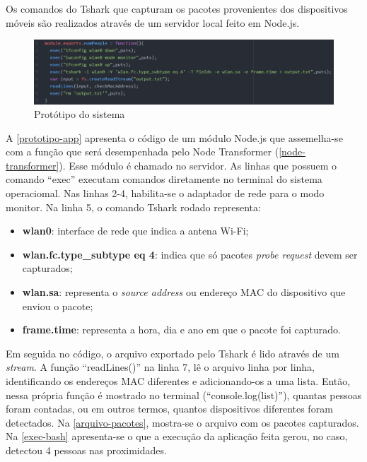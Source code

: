 Os comandos do Tshark que capturam os pacotes provenientes dos dispositivos móveis são realizados através de um servidor local
feito em Node.js.

\begin{figure}[!h]
  \caption{\label{prototipo-app}Protótipo do sistema}
  \begin{center}
    \includegraphics[width=1.0\textwidth]{img/prototipo-app.png}
  \end{center}
\end{figure}

A \autoref{prototipo-app} apresenta o código de um módulo Node.js que
assemelha-se com a função que será desempenhada pelo Node Transformer
(\autoref{node-transformer}). Esse módulo é chamado no servidor. As linhas que
possuem o comando ``exec'' executam comandos diretamente no terminal do sistema
operaciomal. Nas linhas 2-4, habilita-se o adaptador de rede para o modo
monitor. Na linha 5, o comando Tshark rodado representa:

\begin{itemize}
  \item \textbf{wlan0}: interface de rede que indica a antena Wi-Fi;
  \item \textbf{wlan.fc.type\_subtype eq 4}: indica que só pacotes \emph{probe request} devem ser capturados;
  \item \textbf{wlan.sa}: representa o \emph{source address} ou endereço MAC do dispositivo que enviou o pacote;
  \item \textbf{frame.time}: representa a hora, dia e ano em que o pacote foi capturado.
\end{itemize}

Em seguida no código, o arquivo exportado pelo Tshark é lido através de um \emph{stream}. A função ``readLines()''
na linha 7, lê o arquivo linha por linha, identificando os endereços MAC diferentes e adicionando-os a uma lista.
Então, nessa própria função é mostrado no terminal (``console.log(list)''), quantas pessoas foram contadas, ou em outros termos,
quantos dispositivos diferentes foram detectados. Na \autoref{arquivo-pacotes}, mostra-se o arquivo com os pacotes
capturados. Na \autoref{exec-bash} apresenta-se o que a execução da aplicação feita gerou, no caso, detectou
4 pessoas nas proximidades.

